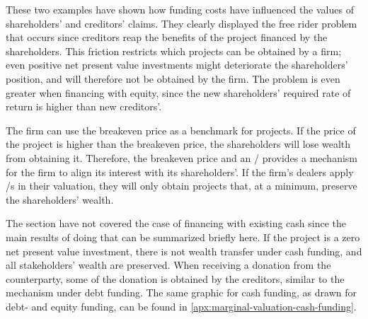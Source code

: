 \documentclass[main.tex]{subfiles}
\begin{document}
    These two examples have shown how funding costs have influenced 
    the values of shareholders' and creditors' claims.
    They clearly displayed the free rider problem that occurs
    since creditors reap the benefits of the project financed by the shareholders.
    This friction restricts which projects can be obtained by a firm;
    even positive net present value investments might deteriorate the shareholders' position,
    and will therefore not be obtained by the firm.
    The problem is even greater when financing with equity, 
    since the new shareholders' required rate of return is higher than new creditors'.
   
    The firm can use the breakeven price as a benchmark for projects. 
    If the price of the project is higher than the breakeven price, 
    the shareholders will lose wealth from obtaining it.
    Therefore, the breakeven price and an \FVA/ provides a mechanism for the firm
    to align its interest with its shareholders'.
    If the firm's dealers apply \FVA/s in their valuation,
    they will only obtain projects that, at a minimum, preserve the shareholders' wealth.
    
    The section have not covered the case of financing with existing cash
    since the main results of doing that can be summarized briefly here.
    If the project is a zero net present value investment, 
    there is not wealth transfer under cash funding,
    and all stakeholders' wealth are preserved.
    When receiving a donation from the counterparty, 
    some of the donation is obtained by the creditors, similar to the mechanism under debt funding.
    The same graphic for cash funding, as drawn for debt- and equity funding, can be found in 
    \cref{apx:marginal-valuation-cash-funding}.
\end{document}
